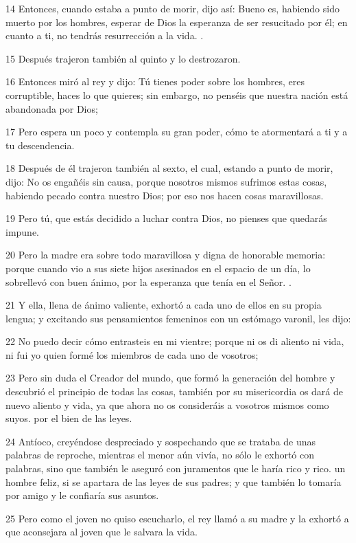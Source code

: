 \par 14 Entonces, cuando estaba a punto de morir, dijo así: Bueno es, habiendo sido muerto por los hombres, esperar de Dios la esperanza de ser resucitado por él; en cuanto a ti, no tendrás resurrección a la vida. .
\par 15 Después trajeron también al quinto y lo destrozaron.
\par 16 Entonces miró al rey y dijo: Tú tienes poder sobre los hombres, eres corruptible, haces lo que quieres; sin embargo, no penséis que nuestra nación está abandonada por Dios;
\par 17 Pero espera un poco y contempla su gran poder, cómo te atormentará a ti y a tu descendencia.
\par 18 Después de él trajeron también al sexto, el cual, estando a punto de morir, dijo: No os engañéis sin causa, porque nosotros mismos sufrimos estas cosas, habiendo pecado contra nuestro Dios; por eso nos hacen cosas maravillosas.
\par 19 Pero tú, que estás decidido a luchar contra Dios, no pienses que quedarás impune.
\par 20 Pero la madre era sobre todo maravillosa y digna de honorable memoria: porque cuando vio a sus siete hijos asesinados en el espacio de un día, lo sobrellevó con buen ánimo, por la esperanza que tenía en el Señor. .
\par 21 Y ella, llena de ánimo valiente, exhortó a cada uno de ellos en su propia lengua; y excitando sus pensamientos femeninos con un estómago varonil, les dijo:
\par 22 No puedo decir cómo entrasteis en mi vientre; porque ni os di aliento ni vida, ni fui yo quien formé los miembros de cada uno de vosotros;
\par 23 Pero sin duda el Creador del mundo, que formó la generación del hombre y descubrió el principio de todas las cosas, también por su misericordia os dará de nuevo aliento y vida, ya que ahora no os consideráis a vosotros mismos como suyos. por el bien de las leyes.
\par 24 Antíoco, creyéndose despreciado y sospechando que se trataba de unas palabras de reproche, mientras el menor aún vivía, no sólo le exhortó con palabras, sino que también le aseguró con juramentos que le haría rico y rico. un hombre feliz, si se apartara de las leyes de sus padres; y que también lo tomaría por amigo y le confiaría sus asuntos.
\par 25 Pero como el joven no quiso escucharlo, el rey llamó a su madre y la exhortó a que aconsejara al joven que le salvara la vida.
